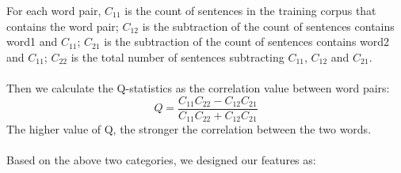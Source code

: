For each word pair, $C_{11}$ is the count of sentences in the training corpus that contains the word pair; $C_{12}$ is the 
subtraction of the count of sentences contains word1 and $C_{11}$; $C_{21}$ is the subtraction of the count of sentences contains word2 and $C_{11}$; $C_{22}$ is the total number of sentences subtracting $C_{11}$, $C_{12}$ and $C_{21}$.\\
\\Then we calculate the Q-statistics as the correlation value between word pairs:
\begin{equation}
	Q=\frac{C_{11}C_{22} - C_{12}C_{21}}{C_{11}C_{22} + C_{12}C_{21}}
\end{equation}
The higher value of Q, the stronger the correlation between the two words.\\\\
Based on the above two categories, we designed our features as:
\vspace{-\topsep}
